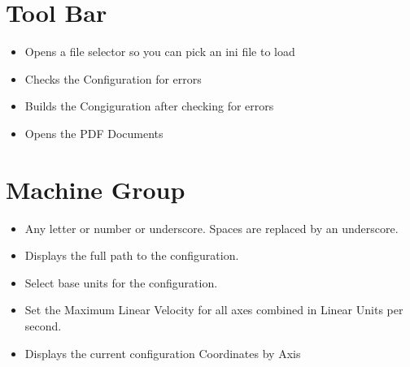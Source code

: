 \documentclass[letterpaper,10pt,english,openany,oneside]{sphinxmanual}
\begin{document}
\section{Tool Bar}
\label{\detokenize{machine:tool-bar}}\begin{itemize}
\item {} 
 \sphinxhyphen{} Opens a file selector so you can pick an ini file to load

\item {} 
 \sphinxhyphen{} Checks the Configuration for errors

\item {} 
 \sphinxhyphen{} Builds the Congiguration after checking for errors

\item {} 
 \sphinxhyphen{} Opens the PDF Documents

\end{itemize}


\section{Machine Group}
\label{\detokenize{machine:machine-group}}\begin{itemize}
\item {} 
 \sphinxhyphen{} Any letter or number or underscore. Spaces are
replaced by an underscore.

\item {} 
 \sphinxhyphen{} Displays the full path to the configuration.

\item {} 
 \sphinxhyphen{} Select base units for the configuration.

\item {} 
 \sphinxhyphen{} Set the Maximum Linear Velocity for all axes
combined in Linear Units per second.

\item {} 
 \sphinxhyphen{} Displays the current configuration Coordinates by Axis

\end{itemize}
\end{document}
